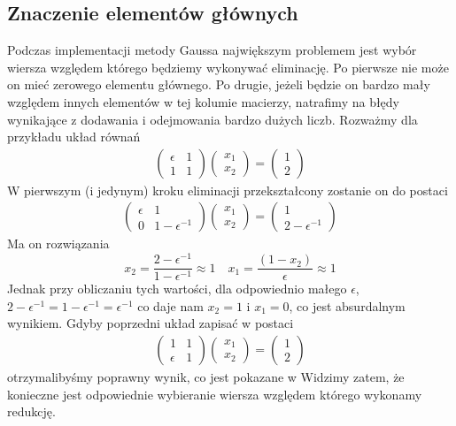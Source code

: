 \documentclass[11pt,wide]{mwart}
\begin{document}
\subsection{Znaczenie elementów głównych}
Podczas implementacji metody Gaussa największym problemem jest wybór wiersza względem którego będziemy wykonywać eliminację. Po pierwsze nie może on mieć zerowego elementu głównego. Po drugie, jeżeli będzie on bardzo mały względem innych elementów w tej kolumie macierzy, natrafimy na błędy wynikające z dodawania i odejmowania bardzo dużych liczb. Rozważmy dla przykładu układ równań
\begin{align} \label{eq:gaussfail}
\left(\begin{matrix}
\epsilon & 1	\\
       1 & 1
\end{matrix}\right)
\left(\begin{matrix}
x_1 \\ x_2
\end{matrix}\right) = 
\left(\begin{matrix}
1 \\ 2
\end{matrix}\right)
\end{align}
W pierwszym (i jedynym) kroku eliminacji przekształcony zostanie on do postaci
\begin{align*}
\left(\begin{matrix}
\epsilon & 1	\\
 0 & 1 - \epsilon^{-1}
\end{matrix}\right)
\left(\begin{matrix}
x_1 \\ x_2
\end{matrix}\right) = 
\left(\begin{matrix}
1 \\ 2 - \epsilon^{-1}
\end{matrix}\right)
\end{align*}
Ma on rozwiązania 
$$ 
x_2 = \frac{2 - \epsilon^{-1}}{1 - \epsilon^{-1}} \approx 1 \quad x_1 = \frac{(1 - x_2)}{\epsilon} \approx 1
$$
Jednak przy obliczaniu tych wartości, dla odpowiednio małego $ \epsilon $,  $ 2 - \epsilon^{-1} = 1 - \epsilon^{-1} = \epsilon^{-1} $ co daje nam $ x_2 = 1 $ i $ x_1 = 0 $, co jest absurdalnym wynikiem. Gdyby poprzedni układ zapisać w postaci
\begin{align*}
\left(\begin{matrix}
       1 & 1 \\
\epsilon & 1
\end{matrix}\right)
\left(\begin{matrix}
x_1 \\ x_2
\end{matrix}\right) = 
\left(\begin{matrix}
1 \\ 2
\end{matrix}\right)
\end{align*}
otrzymalibyśmy poprawny wynik, co jest pokazane w \cite{kincaid}
Widzimy zatem, że konieczne jest odpowiednie wybieranie wiersza względem którego wykonamy redukcję.
\end{document}
